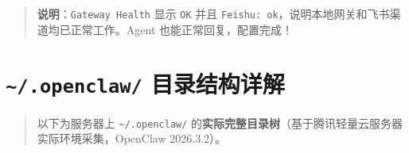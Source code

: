 \begin{quote}
\textbf{说明}：\texttt{Gateway Health} 显示 \texttt{OK} 并且 \texttt{Feishu: ok}，说明本地网关和飞书渠道均已正常工作。Agent 也能正常回复，配置完成！
\end{quote}

\hrulefill

\section{\texttt{\textasciitilde{}/.openclaw/} 目录结构详解}


\begin{quote}
以下为服务器上 \texttt{\textasciitilde{}/.openclaw/} 的\textbf{实际完整目录树}（基于腾讯轻量云服务器实际环境采集，OpenClaw 2026.3.2）。
\end{quote}


